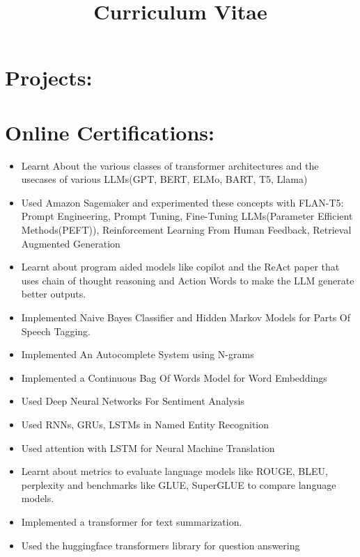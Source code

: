 \documentclass[11pt,a4paper,sans]{moderncv}
\title{Curriculum Vitae}
\begin{document}
\makecvtitle

\section{Projects:}
\section{Online Certifications:}
 \vspace{5pt}
\begin{itemize}
  \item Learnt About the various classes of transformer architectures and the usecases of various LLMs(GPT, BERT, ELMo, BART, T5, Llama)
\item Used Amazon Sagemaker and experimented these concepts with FLAN-T5: Prompt Engineering, Prompt Tuning, Fine-Tuning LLMs(Parameter Efficient Methods(PEFT)), Reinforcement Learning From Human Feedback, Retrieval Augmented Generation
\item Learnt about program aided models like copilot and the ReAct paper that uses chain of thought reasoning and Action Words to make the LLM generate better outputs.
\end{itemize}\vspace{5pt}
 \vspace{5pt}
\begin{itemize}
  \item Implemented Naive Bayes Classifier and Hidden Markov Models for Parts Of Speech Tagging.
  \item Implemented An Autocomplete System using N-grams
  \item Implemented a Continuous Bag Of Words Model for Word Embeddings
  \item Used Deep Neural Networks For Sentiment Analysis
  \item Used RNNs, GRUs, LSTMs in Named Entity Recognition
  \item Used attention with LSTM for Neural Machine Translation
  \item Learnt about metrics to evaluate language models like ROUGE, BLEU, perplexity and benchmarks like GLUE, SuperGLUE to compare language models.
  \item Implemented a transformer for text summarization.
  \item Used the huggingface transformers library for question answering
\end{itemize}\vspace{5pt}
\end{document}
